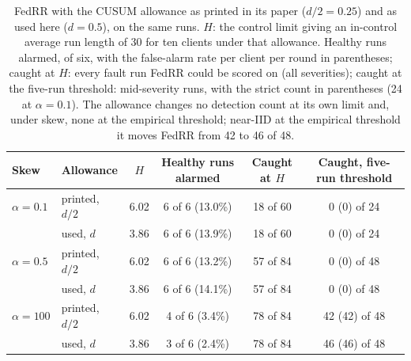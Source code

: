 \begin{table}[H]
\centering
\small
\begin{tabular}{llcccc}
\toprule
Skew & Allowance & $H$ & Healthy runs alarmed & Caught at $H$ & Caught, five-run threshold \\
\midrule
$\alpha = 0.1$ & printed, $d/2$ & 6.02 & 6 of 6 (13.0\%) & 18 of 60 & 0 (0) of 24 \\
 & used, $d$ & 3.86 & 6 of 6 (13.9\%) & 18 of 60 & 0 (0) of 24 \\
\addlinespace
$\alpha = 0.5$ & printed, $d/2$ & 6.02 & 6 of 6 (13.2\%) & 57 of 84 & 0 (0) of 48 \\
 & used, $d$ & 3.86 & 6 of 6 (14.1\%) & 57 of 84 & 0 (0) of 48 \\
\addlinespace
$\alpha = 100$ & printed, $d/2$ & 6.02 & 4 of 6 (3.4\%) & 78 of 84 & 42 (42) of 48 \\
 & used, $d$ & 3.86 & 3 of 6 (2.4\%) & 78 of 84 & 46 (46) of 48 \\
\bottomrule
\end{tabular}
\caption{FedRR with the CUSUM allowance as printed in its paper ($d/2 = 0.25$) and as used here ($d = 0.5$), on the same runs. $H$: the control limit giving an in-control average run length of 30 for ten clients under that allowance. Healthy runs alarmed, of six, with the false-alarm rate per client per round in parentheses; caught at $H$: every fault run FedRR could be scored on (all severities); caught at the five-run threshold: mid-severity runs, with the strict count in parentheses (24 at $\alpha = 0.1$). The allowance changes no detection count at its own limit and, under skew, none at the empirical threshold; near-IID at the empirical threshold it moves FedRR from 42 to 46 of 48.}
\label{tab:fedrr-allowance}
\end{table}
